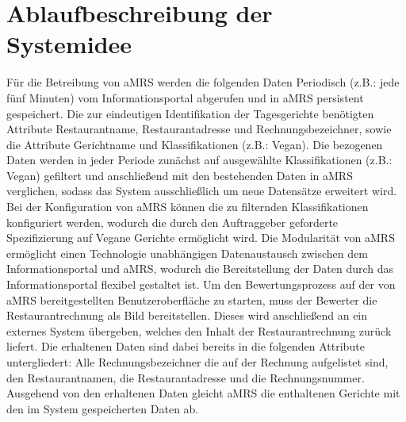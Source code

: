 \section{Ablaufbeschreibung der Systemidee}
Für die Betreibung von \ac{aMRS} werden die folgenden Daten Periodisch (z.B.: jede fünf Minuten) vom Informationsportal abgerufen und in \ac{aMRS} persistent gespeichert.
Die zur eindeutigen Identifikation der Tagesgerichte benötigten Attribute Restaurantname, Restaurantadresse und Rechnungsbezeichner, sowie die Attribute Gerichtname und Klassifikationen (z.B.: Vegan).
Die bezogenen Daten werden in jeder Periode zunächst auf ausgewählte Klassifikationen (z.B.: Vegan) gefiltert und anschließend mit den bestehenden Daten in \ac{aMRS} verglichen, sodass das System ausschließlich um neue Datensätze erweitert wird.
Bei der Konfiguration von \ac{aMRS} können die zu filternden Klassifikationen konfiguriert werden, wodurch die durch den Auftraggeber geforderte Spezifizierung auf Vegane Gerichte ermöglicht wird.
\newparagraph
Die Modularität von \ac{aMRS} ermöglicht einen Technologie unabhängigen Datenaustausch zwischen dem Informationsportal und \ac{aMRS}, wodurch die Bereitstellung der Daten durch das Informationsportal flexibel gestaltet ist.
\newparagraph
Um den Bewertungsprozess auf der von \ac{aMRS} bereitgestellten Benutzeroberfläche zu starten, muss der Bewerter die Restaurantrechnung als Bild bereitstellen.
Dieses wird anschließend an ein externes System übergeben, welches den Inhalt der Restaurantrechnung zurück liefert.
Die erhaltenen Daten sind dabei bereits in die folgenden Attribute untergliedert: Alle Rechnungsbezeichner die auf der Rechnung aufgelistet sind, den Restaurantnamen, die Restaurantadresse und die Rechnungsnummer.
Ausgehend von den erhaltenen Daten gleicht \ac{aMRS} die enthaltenen Gerichte mit den im System gespeicherten Daten ab.
